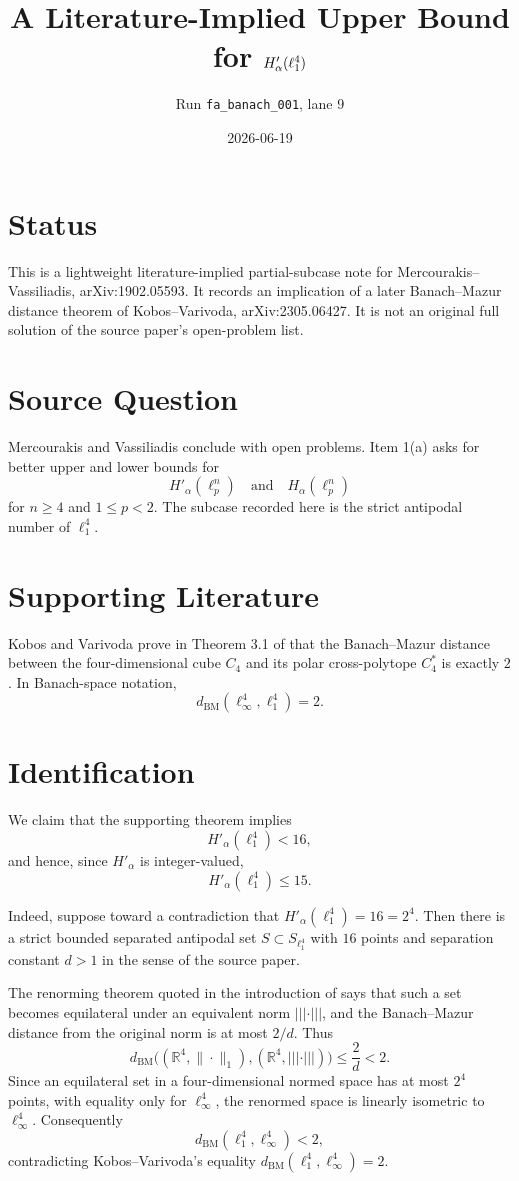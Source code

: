 \documentclass[11pt]{article}
\title{A Literature-Implied Upper Bound for \texorpdfstring{\(\Hap(\ell_1^4)\)}{H'alpha(ell1^4)}}
\author{Run \texttt{fa\_banach\_001}, lane 9}
\date{2026-06-19}
\newcommand{\BM}{d_{\mathrm{BM}}}
\newcommand{\ellone}{\ell_1^4}
\newcommand{\ellinf}{\ell_\infty^4}
\newcommand{\Ha}{H_\alpha}
\newcommand{\Hap}{H'_\alpha}
\begin{document}
\maketitle

\section*{Status}

This is a lightweight literature-implied partial-subcase note for
Mercourakis--Vassiliadis, arXiv:1902.05593.  It records an implication of a
later Banach--Mazur distance theorem of Kobos--Varivoda, arXiv:2305.06427.
It is not an original full solution of the source paper's open-problem list.

\section*{Source Question}

Mercourakis and Vassiliadis conclude with open problems.  Item 1(a) asks for
better upper and lower bounds for
\[
  \Hap(\ell_p^n)\quad\text{and}\quad \Ha(\ell_p^n)
\]
for \(n\ge 4\) and \(1\le p<2\).  The subcase recorded here is the strict
antipodal number of \(\ell_1^4\).

\section*{Supporting Literature}

Kobos and Varivoda prove in Theorem 3.1 of \cite{KV} that the Banach--Mazur
distance between the four-dimensional cube \(C_4\) and its polar
cross-polytope \(C_4^*\) is exactly \(2\).  In Banach-space notation,
\[
  \BM(\ellinf,\ellone)=2.
\]

\section*{Identification}

We claim that the supporting theorem implies
\[
  \Hap(\ellone) < 16,
\]
and hence, since \(\Hap\) is integer-valued,
\[
  \Hap(\ellone) \le 15.
\]

Indeed, suppose toward a contradiction that
\(\Hap(\ellone)=16=2^4\).  Then there is a strict bounded separated antipodal
set \(S\subset S_{\ellone}\) with \(16\) points and separation constant
\(d>1\) in the sense of the source paper.

The renorming theorem quoted in the introduction of \cite{MV} says that such
a set becomes equilateral under an equivalent norm \(|||\cdot|||\), and the
Banach--Mazur distance from the original norm is at most \(2/d\).  Thus
\[
  \BM\bigl((\mathbb R^4,\|\cdot\|_1),(\mathbb R^4,|||\cdot|||)\bigr)
  \le \frac{2}{d}<2.
\]
Since an equilateral set in a four-dimensional normed space has at most
\(2^4\) points, with equality only for \(\ell_\infty^4\), the renormed space
is linearly isometric to \(\ellinf\).  Consequently
\[
  \BM(\ellone,\ellinf)<2,
\]
contradicting Kobos--Varivoda's equality \(\BM(\ellone,\ellinf)=2\).
\end{document}
